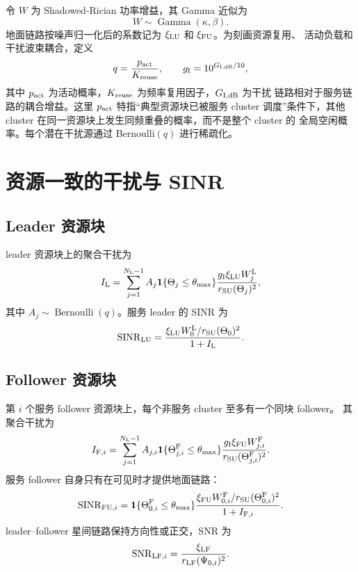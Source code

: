 \documentclass[UTF8,a4paper,11pt]{ctexart}
\newcommand{\NL}{N_{\mathrm L}}
\newcommand{\SINR}{\operatorname{SINR}}
\newcommand{\SNR}{\operatorname{SNR}}
\newcommand{\thetam}{\theta_{\max}}
\begin{document}
令 $W$ 为 Shadowed-Rician 功率增益，其 Gamma 近似为
\begin{equation}
 W\sim\operatorname{Gamma}(\kappa,\beta).
\end{equation}
地面链路按噪声归一化后的系数记为 $\xi_{\rm LU}$ 和 $\xi_{\rm FU}$。为刻画资源复用、
活动负载和干扰波束耦合，定义
\begin{equation}
 q=\frac{p_{\rm act}}{K_{\rm reuse}},
 \qquad
 g_{\rm I}=10^{G_{\rm I,dB}/10},
\end{equation}
其中 $p_{\rm act}$ 为活动概率，$K_{\rm reuse}$ 为频率复用因子，$G_{\rm I,dB}$ 为干扰
链路相对于服务链路的耦合增益。这里 $p_{\rm act}$ 特指“典型资源块已被服务 cluster
调度”条件下，其他 cluster 在同一资源块上发生同频重叠的概率，而不是整个 cluster 的
全局空闲概率。每个潜在干扰源通过 Bernoulli$(q)$ 进行稀疏化。

\section{资源一致的干扰与 SINR}

\subsection{Leader 资源块}

leader 资源块上的聚合干扰为
\begin{equation}
 I_{\rm L}
 =
 \sum_{j=1}^{\NL-1}
 A_j
 \mathbf 1\{\Theta_j\leq\thetam\}
 \frac{g_{\rm I}\xi_{\rm LU}W_j^{\rm L}}{r_{\rm SU}(\Theta_j)^2},
 \label{eq:leader-rb-interference}
\end{equation}
其中 $A_j\sim\operatorname{Bernoulli}(q)$。服务 leader 的 SINR 为
\begin{equation}
 \SINR_{\rm LU}
 =
 \frac{\xi_{\rm LU}W_0^{\rm L}/r_{\rm SU}(\Theta_0)^2}{1+I_{\rm L}}.
 \label{eq:leader-sinr}
\end{equation}

\subsection{Follower 资源块}

第 $i$ 个服务 follower 资源块上，每个非服务 cluster 至多有一个同块 follower。
其聚合干扰为
\begin{equation}
 I_{{\rm F},i}
 =
 \sum_{j=1}^{\NL-1}
 A_{j,i}
 \mathbf 1\{\Theta_{j,i}^{\rm F}\leq\thetam\}
 \frac{g_{\rm I}\xi_{\rm FU}W_{j,i}^{\rm F}}
 {r_{\rm SU}(\Theta_{j,i}^{\rm F})^2}.
 \label{eq:follower-rb-interference}
\end{equation}
服务 follower 自身只有在可见时才提供地面链路：
\begin{equation}
 \SINR_{{\rm FU},i}
 =
 \mathbf 1\{\Theta_{0,i}^{\rm F}\leq\thetam\}
 \frac{\xi_{\rm FU}W_{0,i}^{\rm F}/r_{\rm SU}(\Theta_{0,i}^{\rm F})^2}
 {1+I_{{\rm F},i}}.
 \label{eq:follower-sinr}
\end{equation}
leader--follower 星间链路保持方向性或正交，SNR 为
\begin{equation}
 \SNR_{{\rm LF},i}
 =
 \frac{\xi_{\rm LF}}{r_{\rm LF}(\Psi_{0,i})^2}.
\end{equation}
\end{document}
